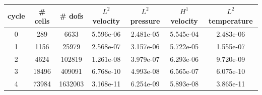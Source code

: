 \documentclass[10pt]{report}
\begin{document}
\begin{table}[H]
\begin{center}
\begin{tabular}{|c|c|c|c|c|c|c|} \hline
cycle & \# cells & \# dofs & $L^2$ velocity & $L^2$ pressure & $H^1$ velocity & $L^2$ temperature\\ \hline
0 & 289 & 6633 & 5.596e-06 & 2.481e-05 & 5.545e-04 & 2.483e-06\\ \hline
1 & 1156 & 25979 & 2.568e-07 & 3.157e-06 & 5.722e-05 & 1.555e-07\\ \hline
2 & 4624 & 102819 & 1.261e-08 & 3.979e-07 & 6.293e-06 & 9.720e-09\\ \hline
3 & 18496 & 409091 & 6.768e-10 & 4.993e-08 & 6.565e-07 & 6.075e-10\\ \hline
4 & 73984 & 1632003 & 3.168e-11 & 6.254e-09 & 5.893e-08 & 3.865e-11\\ \hline
\end{tabular}
\end{center}
\end{table}
\end{document}
